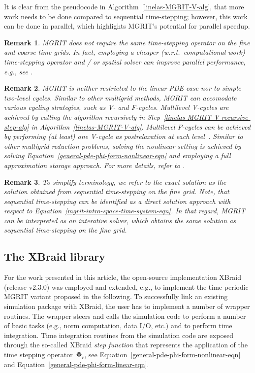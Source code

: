 \documentclass[3p]{elsarticle}
\newtheorem{remark}{Remark}
\begin{document}
It is clear from the pseudocode in Algorithm~\ref{linelas-MGRIT-V-alg},
that more work needs to be done compared to sequential time-stepping;
however, this work can be done in parallel, which highlights MGRIT's potential for parallel speedup.

\begin{remark}
    MGRIT does not require the same time-stepping operator
    on the fine and coarse time grids.
    In fact, employing a \emph{cheaper} (w.r.t.\ computational work)
    time-stepping operator and / or spatial solver can improve parallel performance,
    e.g., see \cite{BrummelenZeeBorst2008,Richter2015}.
\end{remark}

\begin{remark}
    MGRIT is neither restricted to the linear PDE case nor to simple two-level cycles.
    Similar to other multigrid methods, MGRIT can accomodate various cycling strategies, such as V- and F-cycles.
    Multilevel V-cycles are achieved by calling the algorithm recursively in Step~\ref{linelas-MGRIT-V-recursive-step-alg}
    in Algorithm~\ref{linelas-MGRIT-V-alg}.
    Multilevel F-cycles can be achieved by performing (at least) one V-cycle as postrelaxation
    at each level~\cite{TrottenbergOsterleeSchueller2001}.
    Similar to other multigrid reduction problems, solving the nonlinear setting is achieved
    by solving Equation~\eqref{general-pde-phi-form-nonlinear-eqn}
    and employing a full approximation storage approach. For more details, refer to
    \cite{FriedhoffFalgoutKolevMaclachlanSchroder2012,FalgoutFriedhoffKolevMaclachlanSchroder2014}.
\end{remark}

\begin{remark}
    To simplify terminology, we refer to the exact solution as the solution
    obtained from sequential time-stepping on the fine grid.
    Note, that sequential time-stepping can be identified as a direct solution approach
    with respect to Equation~\eqref{mgrit-intro-space-time-system-eqn}.
    In that regard, MGRIT can be interpreted as an interative solver,
    which obtains the same solution as sequential time-stepping on the fine grid.
\end{remark}
\subsection{The XBraid library}
\label{mgrit-xbraid-sec}
For the work presented in this article, the open-source implementation {XBraid}~\cite{XBraid}
(release v2.3.0) was employed and extended, e.g., to implement the time-periodic MGRIT
variant proposed in the following.
To successfully link an existing simulation package with XBraid, the user has to implement a number
of wrapper routines.
The wrapper steers and calls the simulation code to perform a number of basic tasks
(e.g., norm computation, data I/O, etc.) and to perform time integration.
Time integration routines from the simulation code are exposed through the so-called XBraid \emph{step function}
that represents the application of the time stepping operator~$\boldsymbol{\Phi}_\ell$,
see Equation~\eqref{general-pde-phi-form-nonlinear-eqn} and Equation~\eqref{general-pde-phi-form-linear-eqn}.
\end{document}
